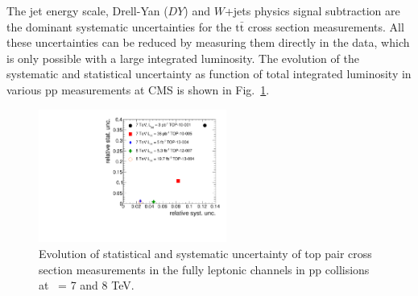 The jet energy scale, Drell-Yan ($DY$) and $W$+jets physics signal subtraction 
are the dominant systematic uncertainties for the $\mathrm{t}\bar{\mathrm{t}}$ 
cross section measurements. All these uncertainties can be reduced by measuring 
them directly in the data, which is only possible with a large integrated luminosity. 
The evolution of the systematic and statistical uncertainty as function of total 
integrated luminosity in various pp measurements at CMS is shown in Fig.~\ref{fig:ttStatSyst}.

\begin{figure}[h!]
\begin{center}
  \includegraphics[width= 0.55\textwidth]{figures/top/topToLLXSecUncertaintiesPP.pdf}
  \caption{Evolution of statistical and systematic uncertainty of top pair cross section 
  measurements in the fully leptonic channels in pp collisions at \roots\ = 7 and 8 TeV.
  }
\label{fig:ttStatSyst}
\end{center}
\end{figure}
